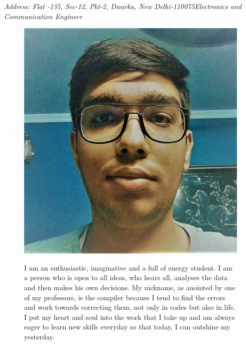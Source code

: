 \documentclass[11pt]{article}
\begin{document}
\textit{Address: Flat -135, Sec-12, Pkt-2, Dwarka, New Delhi-110075}\hspace{2.5cm}\textit{Electronics and Communication Engineer}
\begin{figure}[ht]
\begin{minipage}[b]{0.45\linewidth}
\centering
\includegraphics[scale=0.095]{photo.jpg}
\end{minipage}
\hspace{0.5cm}
\begin{minipage}[b]{0.45\linewidth}
\flushleft
I am an enthusiastic, imaginative and a full of energy student. I am a person who is open to all ideas, who hears all, analyses the data and then makes his own decisions. My nickname, as anointed by one of my professors, is the compiler because I tend to find the errors and work towards correcting them, not only in codes but also in life. I put my heart and soul into the work that I take up and am always eager to learn new skills everyday so that today, I can outshine my yesterday.

\end{minipage}
\end{figure}
\end{document}
